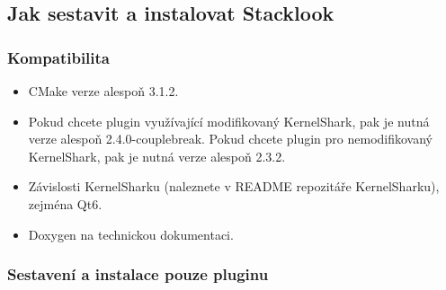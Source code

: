 \subsection{Jak sestavit a instalovat Stacklook}

\subsubsection*{Kompatibilita}

\begin{itemize}
  \item CMake verze alespoň 3.1.2.
  \item Pokud chcete plugin využívající modifikovaný KernelShark, pak je nutná verze alespoň 2.4.0-couplebreak. Pokud chcete plugin pro nemodifikovaný KernelShark, pak je nutná verze alespoň 2.3.2.
  \item Závislosti KernelSharku (naleznete v README repozitáře KernelSharku), zejména Qt6.
  \item Doxygen na technickou dokumentaci.
\end{itemize}

\subsubsection{Sestavení a instalace pouze pluginu}

